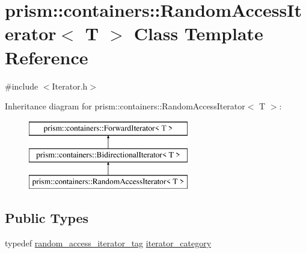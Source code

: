 \hypertarget{classprism_1_1containers_1_1_random_access_iterator}{}\section{prism\+:\+:containers\+:\+:Random\+Access\+Iterator$<$ T $>$ Class Template Reference}
\label{classprism_1_1containers_1_1_random_access_iterator}


{\ttfamily \#include $<$Iterator.\+h$>$}

Inheritance diagram for prism\+:\+:containers\+:\+:Random\+Access\+Iterator$<$ T $>$\+:\begin{figure}[H]
\begin{center}
\leavevmode
\includegraphics[height=3.000000cm]{classprism_1_1containers_1_1_random_access_iterator}
\end{center}
\end{figure}
\subsection*{Public Types}
\begin{DoxyCompactItemize}
\item 
typedef \hyperlink{structprism_1_1containers_1_1random__access__iterator__tag}{random\+\_\+access\+\_\+iterator\+\_\+tag} \hyperlink{classprism_1_1containers_1_1_random_access_iterator_a3ea12689b8be2374e091a3229d8b0592}{iterator\+\_\+category}
\end{DoxyCompactItemize}
